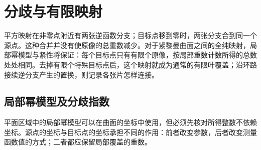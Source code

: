 
% 
% 

\section{分歧与有限映射}
\label{g4:sec:0202}

平方映射在非零点附近有两张逆函数分支；目标点移到零时，两张分支合到同一个源点。这种合并并没有使原像的总重数减少。对于紧黎曼曲面之间的全纯映射，局部幂模型与紧性将保证：每个目标点只有有限个原像，按局部重数计数所得的总数处处相同。去掉有限个特殊目标点后，这个映射就成为通常的有限叶覆盖；沿环路接续逆分支产生的置换，则记录各张片怎样连接。

\subsection{局部幂模型及分歧指数}
\label{g4:subsec:0202:01}
平面区域中的局部幂模型可以在曲面的坐标中使用，但必须先核对所得整数不依赖坐标。源点的坐标与目标点的坐标承担不同的作用：前者改变参数，后者改变测量函数值的方式；二者都应保留局部覆盖的重数。

